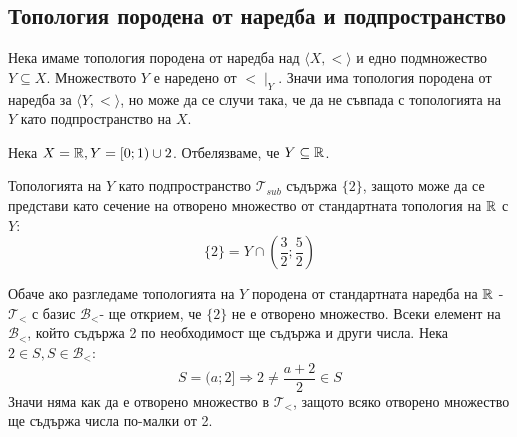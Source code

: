 \subsection{Топология породена от наредба и подпространство}
Нека имаме топология породена от наредба над $\langle X, < \rangle$ и едно подмножество $Y \subseteq X$. Множеството $Y$ е наредено от $< \mid_Y$. Значи има топология породена от наредба за $\langle Y, < \rangle$, но може да се случи така, че да не съвпада с топологията на $Y$ като подпространство на $X$.
\begin{example}
    Нека $X = {\mathbb{R}}, Y = [0; 1) \cup {2}$. Отбелязваме, че $Y \subseteq {\mathbb{R}}$.
    
    Топологията на $Y$ като подпространство $\mathcal T_{sub}$ съдържа $\{2\}$, защото може да се представи като сечение на отворено множество от стандартната топология на ${\mathbb{R}}$ с $Y$:
    \begin{equation}
        \{2\} = Y \cap \left(\frac{3}{2}; \frac{5}{2}\right)
    \end{equation}

    Обаче ако разгледаме топологията на $Y$ породена от стандартната наредба на ${\mathbb{R}}$ - $\mathcal T_<$ с базис $\mathcal B_<$-  ще открием, че $\{2\}$ не е отворено множество. Всеки елемент на $\mathcal B_<$, който съдържа 2 по необходимост ще съдържа и други числа. Нека $2 \in S, S \in \mathcal B_<$:
    \begin{equation}
        S = (a; 2] \Rightarrow 2 \neq \frac{a + 2}{2} \in S
    \end{equation}
    Значи няма как да е отворено множество в $\mathcal T_<$, защото всяко отворено множество ще съдържа числа по-малки от 2.
\end{example}


